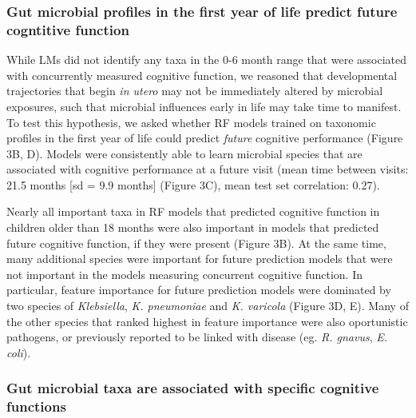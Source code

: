 \documentclass{article}
\begin{document}
\subsubsection*{Gut microbial profiles in the first year of life predict future cogntitive function}

While LMs did not identify any taxa in the 0-6 month range
that were associated with concurrently measured cognitive function,
we reasoned that developmental trajectories that begin
\textit{in utero} may not be immediately altered by
microbial exposures, such that microbial influences early in life
may take time to manifest. To test this hypothesis,
we asked whether RF models trained on taxonomic profiles
in the first year of life
could predict \textit{future} cognitive performance (Figure 3B, D).
Models were consistently able to learn microbial species that are associated
with cognitive performance at a future visit
(mean time between visits: 21.5 months [sd = 9.9 months] (Figure 3C),
mean test set correlation: 0.27).

Nearly all important taxa in RF models that predicted cognitive function
in children older than 18 months were also important in
models that predicted future cognitive function, if they were present (Figure 3B).
At the same time, many additional species were important for future prediction models
that were not important in the models measuring concurrent cognitive function.
In particular, feature importance for future prediction models
were dominated by two species of \textit{Klebsiella},
\textit{K. pneumoniae} and \textit{K. varicola} (Figure 3D, E).
Many of the other species that ranked highest in feature importance
were also oportunistic pathogens, or previously reported
to be linked with disease (eg. \textit{R. gnavus}, \textit{E. coli}).

\subsubsection*{Gut microbial taxa are associated with specific cognitive functions} %
\end{document}
